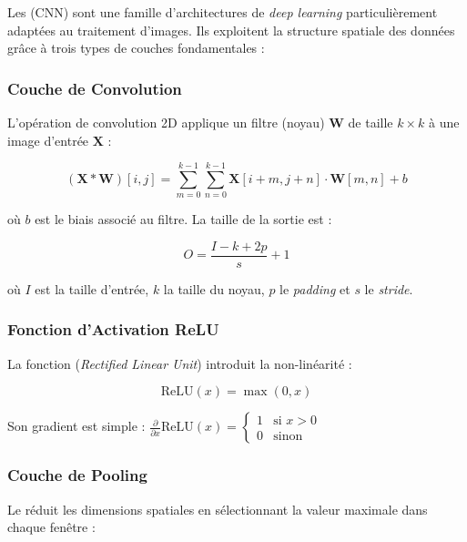 Les  (CNN) \cite{lecun1998, goodfellow2016} sont une famille d'architectures de \textit{deep learning} particulièrement adaptées au traitement d'images. Ils exploitent la structure spatiale des données grâce à trois types de couches fondamentales :

\subsubsection{Couche de Convolution}

L'opération de convolution 2D applique un filtre (noyau) $\mathbf{W}$ de taille $k \times k$ à une image d'entrée $\mathbf{X}$ :

\begin{equation}
(\mathbf{X} * \mathbf{W})[i, j] = \sum_{m=0}^{k-1} \sum_{n=0}^{k-1} \mathbf{X}[i+m, j+n] \cdot \mathbf{W}[m, n] + b
\label{eq:conv2d}
\end{equation}

où $b$ est le biais associé au filtre. La taille de la sortie est :

\begin{equation}
O = \frac{I - k + 2p}{s} + 1
\label{eq:output_size}
\end{equation}

où $I$ est la taille d'entrée, $k$ la taille du noyau, $p$ le \textit{padding} et $s$ le \textit{stride}.

\subsubsection{Fonction d'Activation ReLU}

La fonction  (\textit{Rectified Linear Unit}) introduit la non-linéarité :

\begin{equation}
\text{ReLU}(x) = \max(0, x)
\label{eq:relu}
\end{equation}

Son gradient est simple : $\frac{\partial}{\partial x} \text{ReLU}(x) = \begin{cases} 1 & \text{si } x > 0 \\ 0 & \text{sinon} \end{cases}$

\subsubsection{Couche de Pooling}

Le  réduit les dimensions spatiales en sélectionnant la valeur maximale dans chaque fenêtre :

